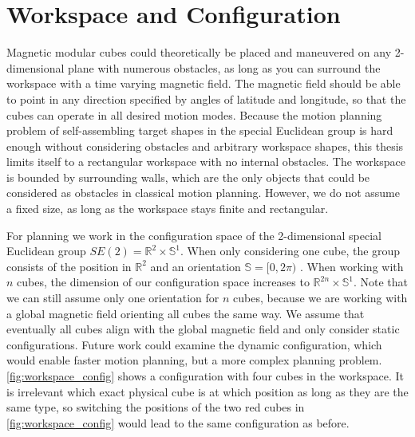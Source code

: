 \section{Workspace and Configuration}
Magnetic modular cubes could theoretically be placed and maneuvered on any 2-dimensional plane with numerous obstacles, as long as you can surround the workspace with a time varying magnetic field.
The magnetic field should be able to point in any direction specified by angles of latitude and longitude, so that the cubes can operate in all desired motion modes.
Because the motion planning problem of self-assembling target shapes in the special Euclidean group is hard enough without considering obstacles and arbitrary workspace shapes, this thesis limits itself to a rectangular workspace with no internal obstacles.
The workspace is bounded by surrounding walls, which are the only objects that could be considered as obstacles in classical motion planning.
However, we do not assume a fixed size, as long as the workspace stays finite and rectangular.

For planning we work in the configuration space of the 2-dimensional special Euclidean group $SE(2) = \mathbb{R}^2 \times \mathbb{S}^1$.
When only considering one cube, the group consists of the position in $\mathbb{R}^2$ and an orientation $\mathbb{S} = [0,2\pi)$ \cite{LaValle2006}.
When working with $n$ cubes, the dimension of our configuration space increases to $\mathbb{R}^{2n} \times \mathbb{S}^1$.
Note that we can still assume only one orientation for $n$ cubes, because we are working with a global magnetic field orienting all cubes the same way.
We assume that eventually all cubes align with the global magnetic field and only consider static configurations.
Future work could examine the dynamic configuration, which would enable faster motion planning, but a more complex planning problem.
\autoref{fig:workspace_config} shows a configuration with four cubes in the workspace.
It is irrelevant which exact physical cube is at which position as long as they are the same type, so switching the positions of the two red cubes in \autoref{fig:workspace_config} would lead to the same configuration as before.

